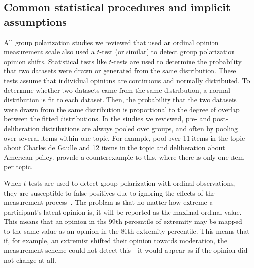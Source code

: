 \subsection{Common statistical procedures and implicit assumptions}

All group polarization studies we reviewed that used an ordinal opinion
measurement scale also used a $t$-test (or similar) to detect group polarization opinion
shifts. Statistical tests like $t$-tests are used to determine the probability
that two datasets were drawn or generated from the same distribution. These
tests assume that individual opinions are continuous
and normally distributed. To determine whether two datasets came from the
same distribution, a normal distribution is fit to each dataset. Then, the
probability that the two datasets were drawn from the same distribution
is proportional to the degree of overlap between the fitted distributions.
In the studies we reviewed, pre- and post-deliberation
distributions are always pooled over groups, and often by 
pooling over several items within one topic. For example, 
pool over 11 items in the topic about Charles de Gaulle and 12 items in the
topic and deliberation about American policy. 
 provide a counterexample to this, where there is only
one item per topic. 

When $t$-tests are used to detect group polarization with ordinal observations, 
they are susceptible to false positives due to ignoring the effects of the
measurement process~\cite{Liddell2018}. 
The problem is that no matter how extreme a participant's
latent opinion is, it will be reported as the maximal ordinal value. This
means that an opinion in the 99th percentile of extremity may be mapped to the
same value as an opinion in the 80th extremity percentile. This means that if,
for example, an extremist shifted their opinion towards moderation, the 
measurement scheme could not detect this---it would appear as if the opinion
did not change at all. 




